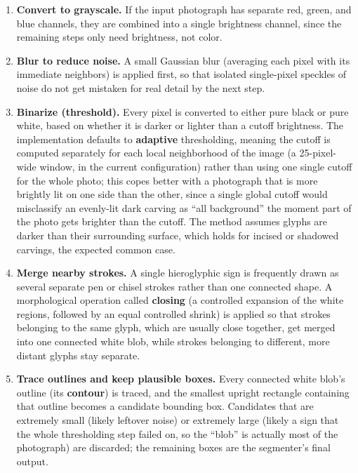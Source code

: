 \documentclass[11pt,a4paper]{report}
\begin{document}
\begin{enumerate}[label=(\arabic*)]
  \item \textbf{Convert to grayscale.} If the input photograph has separate
    red, green, and blue channels, they are combined into a single
    brightness channel, since the remaining steps only need brightness, not
    color.
  \item \textbf{Blur to reduce noise.} A small Gaussian blur (averaging each
    pixel with its immediate neighbors) is applied first, so that isolated
    single-pixel speckles of noise do not get mistaken for real detail by
    the next step.
  \item \textbf{Binarize (threshold).} Every pixel is converted to either
    pure black or pure white, based on whether it is darker or lighter than
    a cutoff brightness. The implementation defaults to \textbf{adaptive}
    thresholding, meaning the cutoff is computed separately for each local
    neighborhood of the image (a 25-pixel-wide window, in the current
    configuration) rather than using one single cutoff for the whole photo;
    this copes better with a photograph that is more brightly lit on one
    side than the other, since a single global cutoff would misclassify an
    evenly-lit dark carving as ``all background'' the moment part of the
    photo gets brighter than the cutoff. The method assumes glyphs are
    darker than their surrounding surface, which holds for incised or
    shadowed carvings, the expected common case.
  \item \textbf{Merge nearby strokes.} A single hieroglyphic sign is
    frequently drawn as several separate pen or chisel strokes rather than
    one connected shape. A morphological operation called \textbf{closing}
    (a controlled expansion of the white regions, followed by an equal
    controlled shrink) is applied so that strokes belonging to the same
    glyph, which are usually close together, get merged into one connected
    white blob, while strokes belonging to different, more distant glyphs
    stay separate.
  \item \textbf{Trace outlines and keep plausible boxes.} Every connected
    white blob's outline (its \textbf{contour}) is traced, and the smallest
    upright rectangle containing that outline becomes a candidate bounding
    box. Candidates that are extremely small (likely leftover noise) or
    extremely large (likely a sign that the whole thresholding step failed
    on, so the ``blob'' is actually most of the photograph) are discarded;
    the remaining boxes are the segmenter's final output.
\end{enumerate}
\end{document}
